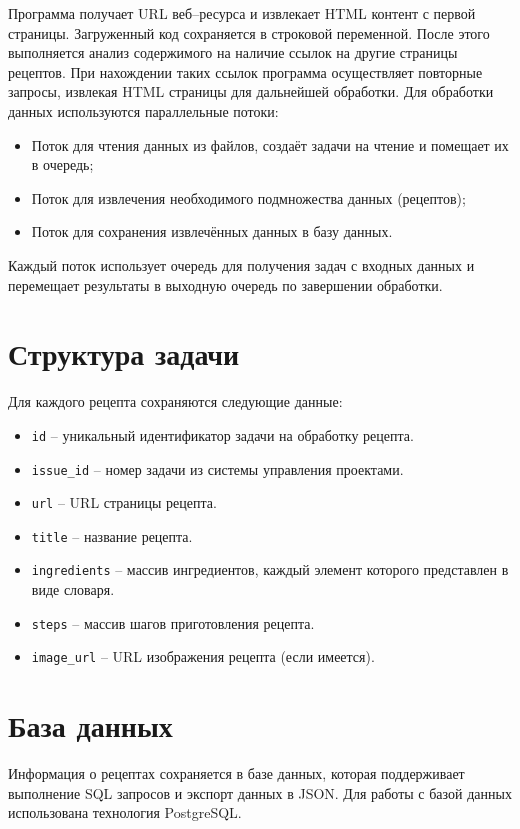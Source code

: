 
Программа получает URL веб--ресурса и извлекает HTML контент с первой страницы. Загруженный код сохраняется в строковой переменной. После этого выполняется анализ содержимого на наличие ссылок на другие страницы рецептов. При нахождении таких ссылок программа осуществляет повторные запросы, извлекая HTML страницы для дальнейшей обработки. Для обработки данных используются параллельные потоки:
\begin{itemize}
    \item Поток для чтения данных из файлов, создаёт задачи на чтение и помещает их в очередь;
    \item Поток для извлечения необходимого подмножества данных (рецептов);
    \item Поток для сохранения извлечённых данных в базу данных.
\end{itemize}
Каждый поток использует очередь для получения задач с входных данных и перемещает результаты в выходную очередь по завершении обработки.

\section{Структура задачи}

Для каждого рецепта сохраняются следующие данные:
\begin{itemize}
    \item \texttt{id} -- уникальный идентификатор задачи на обработку рецепта.
    \item \texttt{issue\_id} -- номер задачи из системы управления проектами.
    \item \texttt{url} -- URL страницы рецепта.
    \item \texttt{title} -- название рецепта.
    \item \texttt{ingredients} -- массив ингредиентов, каждый элемент которого представлен в виде словаря.
    \item \texttt{steps} -- массив шагов приготовления рецепта.
    \item \texttt{image\_url} -- URL изображения рецепта (если имеется).
\end{itemize}


\section{База данных}

Информация о рецептах сохраняется в базе данных, которая поддерживает выполнение SQL запросов и экспорт данных в JSON. Для работы с базой данных использована технология PostgreSQL.


